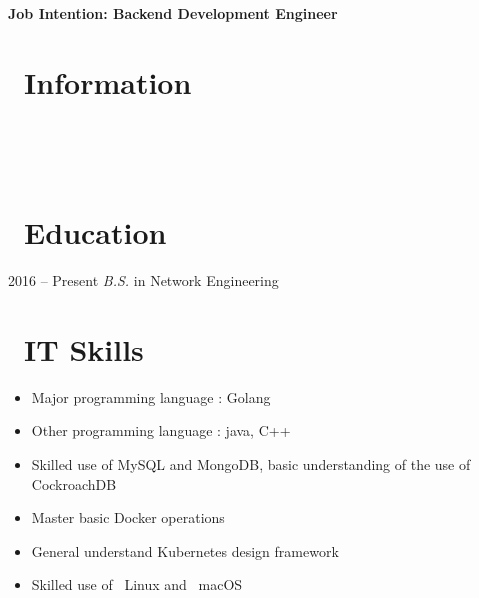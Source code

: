 \documentclass{resume}
\begin{document}

  \hfill \vspace{2mm} \par
\textbf{Job Intention: Backend Development Engineer}

\section{\faUserSecret\ Information} \vspace{1mm}

{\phone\  \qquad\qquad\quad
\email\ 
\vspace{2mm} \par
\github\  \qquad
\faLink\ }

\section{\faGraduationCap\ Education} \vspace{1mm}

{2016 -- Present}
\vspace{1mm}
\textit{B.S.} in Network Engineering

\section{\faCogs\ IT Skills} \vspace{1mm}

\begin{itemize}[parsep=1ex]
  \item Major programming language : Golang
  \item Other programming language : java, C++
  \item Skilled use of MySQL and MongoDB, basic understanding of the use of CockroachDB
  \item Master basic Docker operations
  \item General understand Kubernetes design framework
  \item Skilled use of \faLinux\ {Linux} and \faApple\ {macOS}
\end{itemize}
\end{document}
